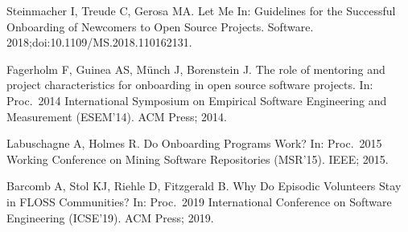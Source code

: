 \documentclass[10pt,letterpaper]{article}
\begin{document}
\begin{thebibliography}{10}
Steinmacher I, Treude C, Gerosa MA.
\newblock Let Me In: Guidelines for the Successful Onboarding of Newcomers to
  Open Source Projects.
 Software. 2018;doi:{10.1109/MS.2018.110162131}.

Fagerholm F, Guinea AS, M\"{u}nch J, Borenstein J.
\newblock The role of mentoring and project characteristics for onboarding in
  open source software projects.
\newblock In: Proc.\ 2014 International Symposium on Empirical Software
  Engineering and Measurement ({ESEM'14}). {ACM} Press; 2014.

Labuschagne A, Holmes R.
\newblock Do Onboarding Programs Work?
\newblock In: Proc.\ 2015 Working Conference on Mining Software Repositories
  ({MSR'15}). {IEEE}; 2015.

Barcomb A, Stol KJ, Riehle D, Fitzgerald B.
\newblock Why Do Episodic Volunteers Stay in FLOSS Communities?
\newblock In: Proc.\ 2019 International Conference on Software Engineering
  ({ICSE'19}). {ACM} Press; 2019.

\end{thebibliography}
\end{document}
